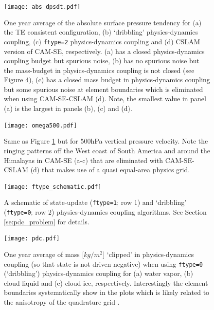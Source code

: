 \documentclass[draft,linenumbers]{agujournal}
\begin{document}
 \begin{figure}
 \centering
 \texttt{[image: abs\_dpsdt.pdf]}
 \caption{One year average of the absolute surface pressure tendency for (a) the TE consistent configuration, (b) `dribbling' physics-dynamics coupling, (c) {\tt{ftype=2}} physics-dynamics coupling and (d) CSLAM version of CAM-SE, respectively. (a) has a closed physics-dynamics coupling budget but spurious noise, (b) has no spurious noise but the mass-budget in physics-dynamics coupling is not closed (see Figure \ref{fig:pdc}), (c) has a closed mass budget in physics-dynamics coupling but some spurious noise at element boundaries which is eliminated when using CAM-SE-CSLAM (d). Note, the smallest value in panel (a) is the largest in panels (b), (c) and (d).}
 \label{fig:abs_dpsdt}
  \end{figure}


 \begin{figure}
 \centering
 \texttt{[image: omega500.pdf]}
 \caption{Same as Figure \ref{fig:abs_dpsdt} but for 500hPa vertical pressure velocity. Note the ringing patterns off the West coast of South America and around the Himalayas in CAM-SE (a-c) that are eliminated with CAM-SE-CSLAM (d) that makes use of a quasi equal-area physics grid.}
 \label{fig:omega500}
  \end{figure}

 \begin{figure}[h]
 \centering
 \texttt{[image: ftype\_schematic.pdf]}
 \caption{A schematic of state-update ({\tt{ftype=1}}; row 1) and `dribbling' ({\tt{ftype=0}}; row 2) physics-dynamics coupling algorithms. See Section \ref{se:pdc_problem} for details.}
 \label{fig:ftype_schematic}
  \end{figure}



 \begin{figure}
 \centering
 \texttt{[image: pdc.pdf]}
 \caption{One year average of mass [$kg/m^2$] `clipped' in physics-dynamics coupling (so that state is not driven negative) when using {\tt{ftype=0}} (`dribbling') physics-dynamics coupling for (a) water vapor, (b) cloud liquid and (c) cloud ice, respectively. Interestingly the element boundaries systematically show in the plots which is likely related to the anisotropy of the quadrature grid \citep{HetAl2018MWR}.}
 \label{fig:pdc}
  \end{figure}
\end{document}
